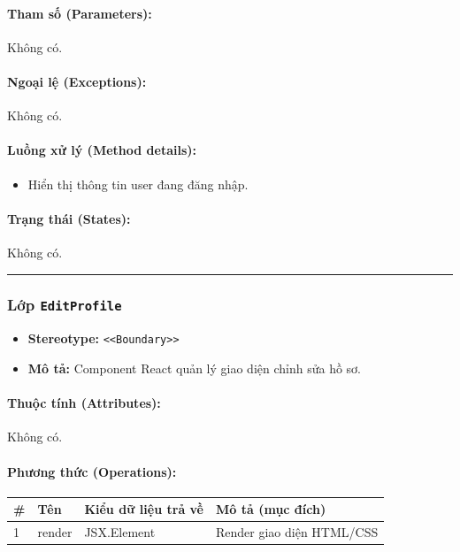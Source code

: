 \documentclass[12pt,a4paper]{article}
\begin{document}
\paragraph{Tham số (Parameters):}
Không có.

\paragraph{Ngoại lệ (Exceptions):}
Không có.

\paragraph{Luồng xử lý (Method details):}
\begin{itemize}[leftmargin=*]
    \item Hiển thị thông tin user đang đăng nhập.
\end{itemize}


\paragraph{Trạng thái (States):}
Không có.

\vskip 0.5cm
\noindent\rule{\textwidth}{0.5pt}
\vskip 0.5cm

\subsubsection{Lớp \texttt{EditProfile}}
\begin{itemize}[leftmargin=*]
    \item \textbf{Stereotype:} \texttt{\textless{}\textless{}Boundary\textgreater{}\textgreater{}}
    \item \textbf{Mô tả:} Component React quản lý giao diện chỉnh sửa hồ sơ.
\end{itemize}

\paragraph{Thuộc tính (Attributes):}
Không có.

\paragraph{Phương thức (Operations):}
\begin{longtable}{|p{0.6cm}|p{3.8cm}|p{2.6cm}|p{6.5cm}|}
\hline
\textbf{\#} & \textbf{Tên} & \textbf{Kiểu dữ liệu trả về} & \textbf{Mô tả (mục đích)} \\ \hline
\endhead
1 & render & JSX.Element & Render giao diện HTML/CSS \\ \hline
\end{longtable}
\end{document}
